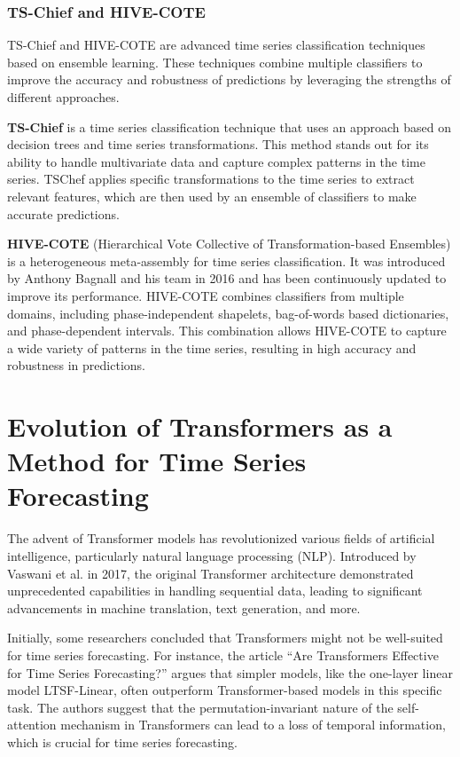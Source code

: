 \subsubsection{TS-Chief and HIVE-COTE}
TS-Chief\cite{Shifaz_2020} and HIVE-COTE\cite{7837946} are advanced time series classification techniques based on ensemble learning. These techniques combine multiple classifiers to improve the accuracy and robustness of predictions by leveraging the strengths of different approaches.
\vspace{10pt}

\textbf{TS-Chief} is a time series classification technique that uses an approach based on decision trees and time series transformations. This method stands out for its ability to handle multivariate data and capture complex patterns in the time series. TSChef applies specific transformations to the time series to extract relevant features, which are then used by an ensemble of classifiers to make accurate predictions.
\vspace{10pt}

\textbf{HIVE-COTE} (Hierarchical Vote Collective of Transformation-based Ensembles) is a heterogeneous meta-assembly for time series classification. It was introduced by Anthony Bagnall and his team in 2016 and has been continuously updated to improve its performance. HIVE-COTE combines classifiers from multiple domains, including phase-independent shapelets, bag-of-words based dictionaries, and phase-dependent intervals. This combination allows HIVE-COTE to capture a wide variety of patterns in the time series, resulting in high accuracy and robustness in predictions.




\section{Evolution of Transformers as a Method for Time Series Forecasting}

The advent of Transformer models has revolutionized various fields of artificial intelligence, particularly natural language processing (NLP). Introduced by Vaswani et al. in 2017\cite{vaswani2023attention}, the original Transformer architecture demonstrated unprecedented capabilities in handling sequential data, leading to significant advancements in machine translation, text generation, and more. 

Initially, some researchers concluded that Transformers might not be well-suited for time series forecasting. For instance, the article “Are Transformers Effective for Time Series Forecasting?”\cite{zeng2022transformerseffectivetimeseries} argues that simpler models, like the one-layer linear model LTSF-Linear, often outperform Transformer-based models in this specific task. The authors suggest that the permutation-invariant nature of the self-attention mechanism in Transformers can lead to a loss of temporal information, which is crucial for time series forecasting.

